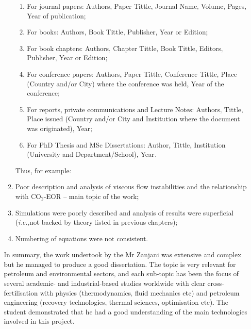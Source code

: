 \documentclass[14pt,twoside]{report}
\newcommand{\ie}{{\it i.e.,}}
\begin{document}
\begin{enumerate}
\begin{enumerate}
\item For journal papers: Authors, Paper Tittle, Journal Name, Volume, Pages, Year of publication;
\item For books: Authors, Book Tittle, Publisher, Year or Edition;
\item For book chapters: Authors, Chapter Tittle, Book Tittle, Editors, Publisher, Year or Edition;
\item For conference papers: Authors, Paper Tittle, Conference Tittle, Place (Country and/or City) where the conference was held, Year of the conference;
\item For reports, private communications and Lecture Notes: Authors, Tittle, Place issued (Country and/or City and Institution where the document was originated), Year;
\item For PhD Thesis and MSc Dissertations: Author, Tittle, Institution (University and Department/School), Year.
\end{enumerate}  
Thus, for example:
%
\item Poor description and analysis of viscous flow instabilities and the relationship with CO$_{2}$-EOR -- main topic of the work;
%
\item Simulations were poorly described and analysis of results were superficial (\ie not backed by theory listed in previous chapters);
%
\item Numbering of equations were not consistent.
% 
\end{enumerate}
In summary, the work undertook by the Mr Zanjani was extensive and complex but he managed to produce a good dissertation. The topic is very relevant for petroleum and environmental sectors, and each sub-topic has been the focus of several academic- and industrial-based studies worldwide with clear cross-fertilisation with physics (thermodynamics, fluid mechanics etc) and petroleum engineering (recovery technologies, thermal sciences, optimisation etc). The student demonstrated that he had a good understanding of the main technologies involved in this project.
\end{document}
